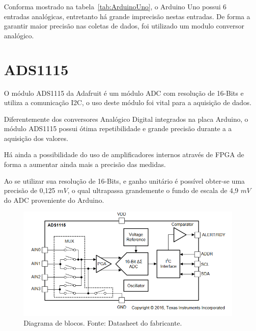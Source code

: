 Conforma mostrado na tabela~\ref{tab:ArduinoUno}, o Arduino Uno possui 6 entradas analógicas, entretanto há grande imprecisão nestas entradas. De forma a garantir maior precisão nas coletas de dados, foi utilizado um modulo conversor analógico.

\section{ADS1115}
O módulo ADS1115 da Adafruit é um módulo ADC com resolução de 16-Bits e utiliza a comunicação I2C, o uso deste módulo foi vital para a aquisição de dados.

Diferentemente dos conversores Analógico Digital integrados na placa Arduino, o módulo ADS1115 possui ótima repetibilidade e grande precisão durante a a aquisição dos valores.

Há ainda a possibilidade do uso de amplificadores internos através de FPGA de forma a aumentar ainda mais a precisão das medidas.

Ao se utilizar sua resolução de 16-Bits, e ganho unitário é possível obter-se uma precisão de 0,125 $mV$, o qual ultrapassa grandemente o fundo de escala de 4,9 $mV$ do ADC proveniente do Arduino.%
\FloatBarrier
\begin{figure}[!htbp]
	\centering
	\includegraphics[scale=0.7]{imagens/ADS}
	\caption{Diagrama de blocos. Fonte: Datasheet do fabricante. }%
	
	\label{fig:Ads}
\end{figure}
\FloatBarrier

